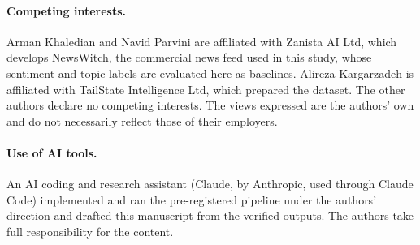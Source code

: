 \paragraph{Competing interests.} Arman Khaledian and Navid Parvini are affiliated with Zanista AI Ltd, which
develops NewsWitch, the commercial news feed used in this study, whose sentiment and topic labels are
evaluated here as baselines. Alireza Kargarzadeh is affiliated with TailState Intelligence Ltd, which
prepared the dataset. The other authors declare no competing interests. The views expressed are the
authors' own and do not necessarily reflect those of their employers.

\paragraph{Use of AI tools.} An AI coding and research assistant (Claude, by Anthropic, used through Claude Code)
implemented and ran the pre-registered pipeline under the authors' direction and drafted this manuscript from the
verified outputs. The authors take full responsibility for the content.
